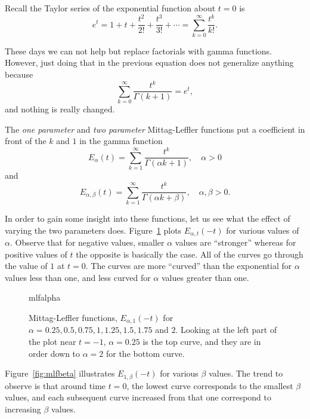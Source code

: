 Recall the Taylor series of the exponential function about $t=0$ is
\begin{equation*}
  e^{t} = 1 + t + \frac{t^2}{2!} + \frac{t^3}{3!} + \cdots = \sum_{k=0}^\infty \frac{t^k}{k!}.
\end{equation*}

These days we can not help but replace factorials with gamma functions. However, just doing that in the previous equation does not generalize anything because
\begin{equation*}
  \sum_{k=0}^\infty \frac{t^k}{\Gamma \left( k + 1 \right)} = e^t,
\end{equation*}
and nothing is really changed. 

The \emph{one parameter} and \emph{two parameter} Mittag-Leffler functions put a coefficient in front of the $k$ and $1$ in the gamma function
\begin{equation}
  \boxed{ E_\alpha(t) = \sum_{k=1}^\infty \frac{t^k}{\Gamma \left( \alpha k + 1 \right)}, \quad \alpha > 0 }
  \label{eq:mlone}
\end{equation}
and
\begin{equation}
  \boxed{  E_{\alpha, \beta}(t) = \sum_{k=1}^\infty \frac{t^k}{\Gamma \left( \alpha k + \beta \right)}, \quad \alpha, \beta > 0. }
  \label{eq:mltwo}
\end{equation}

In order to gain some insight into these functions, let us see what the effect of varying the two parameters does. Figure~\ref{fig:mlfalpha} plots $E_{\alpha,t}(-t)$ for various values of $\alpha$. Observe that for negative values, smaller $\alpha$ values are ``stronger'' whereas for positive values of $t$ the opposite is basically the case. All of the curves go through the value of $1$ at $t=0$. The curves are more ``curved'' than the exponential for $\alpha$ values less than one, and less curved for $\alpha$ values greater than one.

\begin{figure}
  \centering
  {mlfalpha}
  \caption{Mittag-Leffler functions, $E_{\alpha,1}(-t)$ for $\alpha = 0.25, 0.5, 0.75, 1, 1.25, 1.5, 1.75$ and $2$. Looking at the left part of the plot near $t = -1$, $\alpha = 0.25$ is the top curve, and they are in order down to $\alpha = 2$ for the bottom curve.}
  \label{fig:mlfalpha}
\end{figure}

Figure~\ref{fig:mlfbeta} illustrates $E_{1,\beta}(-t)$ for various $\beta$ values. The trend to observe is that around time $t=0$, the lowest curve corresponds to the smallest $\beta$ values, and each subsequent curve increased from that one correspond to increasing $\beta$ values. 

